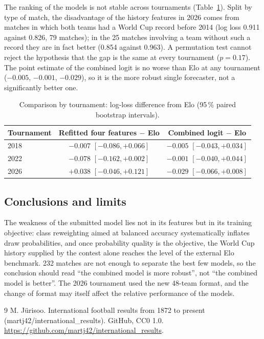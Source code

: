 The ranking of the models is not stable across tournaments (Table~\ref{tab:wc-edition}). Split by type of match, the disadvantage of the history features in 2026 comes from matches in which both teams had a World Cup record before 2014 (log loss 0.911 against 0.826, 79 matches); in the 25 matches involving a team without such a record they are in fact better (0.854 against 0.963). A permutation test cannot reject the hypothesis that the gap is the same at every tournament ($p=0.17$). The point estimate of the combined logit is no worse than Elo at any tournament ($-0.005$, $-0.001$, $-0.029$), so it is the more robust single forecaster, not a significantly better one.

\begin{table}[htbp]\centering\small
\caption{Comparison by tournament: log-loss difference from Elo (95\,\% paired bootstrap intervals).}\label{tab:wc-edition}
\begin{tabular}{lcc}\toprule
Tournament & Refitted four features $-$ Elo & Combined logit $-$ Elo\\\midrule
2018 & $-0.007$ $[-0.086, +0.066]$ & $-0.005$ $[-0.043, +0.034]$\\
2022 & $-0.078$ $[-0.162, +0.002]$ & $-0.001$ $[-0.040, +0.044]$\\
2026 & $+0.038$ $[-0.046, +0.121]$ & $-0.029$ $[-0.066, +0.008]$\\\bottomrule
\end{tabular}
\end{table}

\subsection{Conclusions and limits}
The weakness of the submitted model lies not in its features but in its training objective: class reweighting aimed at balanced accuracy systematically inflates draw probabilities, and once probability quality is the objective, the World Cup history supplied by the contest alone reaches the level of the external Elo benchmark. 232 matches are not enough to separate the best few models, so the conclusion should read ``the combined model is more robust'', not ``the combined model is better''. The 2026 tournament used the new 48-team format, and the change of format may itself affect the relative performance of the models.

\begin{thebibliography}{9}
 M. J\"urisoo. International football results from 1872 to present (martj42/international\_results). GitHub, CC0 1.0. \url{https://github.com/martj42/international_results}.
\end{thebibliography}

